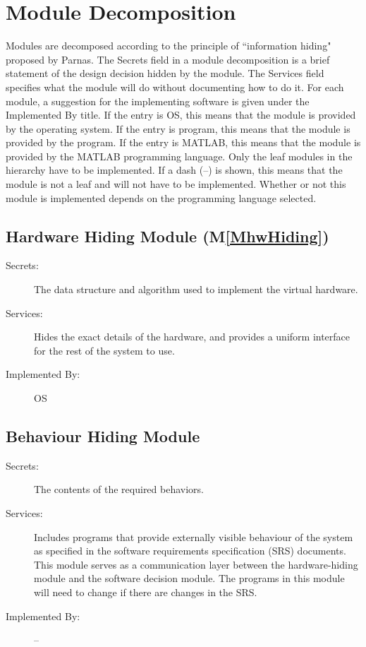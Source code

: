 \documentclass[12pt]{article}
\begin{document}
\section{Module Decomposition}
\label{Sec:MD}
Modules are decomposed according to the principle of ``information hiding" proposed by Parnas. The Secrets field in a module decomposition is a brief statement of the design decision hidden by the module. The Services field specifies what the module will do without documenting how to do it. For each module, a suggestion for the implementing software is given under the Implemented By title. If the entry is OS, this means that the module is provided by the operating system. If the entry is program, this means that the module is provided by the program. If the entry is MATLAB, this means that the module is provided by the MATLAB programming language. Only the leaf modules in the hierarchy have to be implemented. If a dash (--) is shown, this means that the module is not a leaf and will not have to be implemented. Whether or not this module is implemented depends on the programming language selected.
\subsection{Hardware Hiding Module (M\ref{MhwHiding})}
\label{Sec:HHM()}
\begin{description}
\item[Secrets:]The data structure and algorithm used to implement the virtual hardware.
\item[Services:]Hides the exact details of the hardware, and provides a uniform interface for the rest of the system to use.
\item[Implemented By:]OS
\end{description}
\subsection{Behaviour Hiding Module}
\label{Sec:BHM}
\begin{description}
\item[Secrets:]The contents of the required behaviors.
\item[Services:]Includes programs that provide externally visible behaviour of the system as specified in the software requirements specification (SRS) documents. This module serves as a communication layer between the hardware-hiding module and the software decision module. The programs in this module will need to change if there are changes in the SRS.
\item[Implemented By:]--
\end{description}
\end{document}
